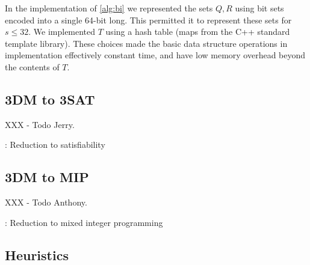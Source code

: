 \documentclass[11pt]{article}
\begin{document}
In the implementation of \autoref{alg:bi} we represented the sets
$Q,R$ using bit sets encoded into a single 64-bit long.  This
permitted it to represent these sets for $s \le 32$.  We implemented
$T$ using a hash table (maps from the C++ standard template library).
These choices made the basic data structure operations in
implementation effectively constant time, and have low memory overhead
beyond the contents of $T$.


\subsection{3DM to 3SAT}

XXX - Todo Jerry.

\label{subsec:sat}

\begin{algorithm}
  \caption{: Reduction to satisfiability}
  \label{alg:sat}
\begin{algorithmic}[1]
  \EndFunction
\end{algorithmic}
\end{algorithm}
  
\subsection{3DM to MIP}

XXX - Todo Anthony.

\label{subsec:mip}

\begin{algorithm}
  \caption{: Reduction to mixed integer programming}
  \label{alg:mip}
\begin{algorithmic}[1]
  \EndFunction
\end{algorithmic}
\end{algorithm}


\subsection{Heuristics}
\label{sec:heuristic}
\end{document}
